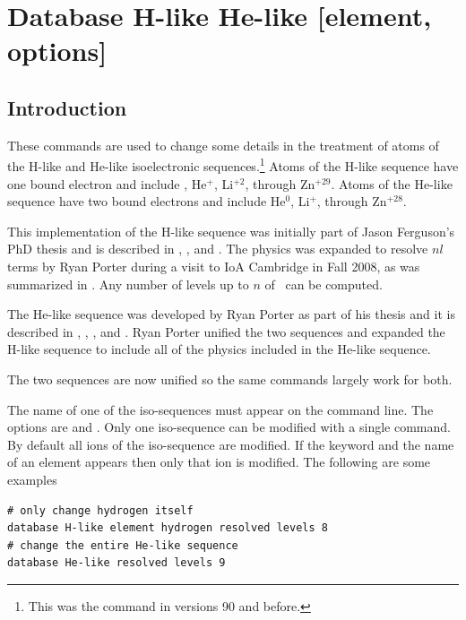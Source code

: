 \section{Database H-like \OR{} He-like [element, options]}
\label{sec:atom_H_He_like}

\subsection{Introduction}
These commands are used to change some details in the treatment of atoms of the
H-like and He-like isoelectronic sequences.\footnote{This was the 
command in versions 90 and before.}
Atoms of the H-like sequence
have one bound electron and include \hO, He$^{+}$, Li$^{+2}$,
through Zn$^{+29}$.
Atoms of the He-like sequence have two bound electrons and include He$^0$,
Li$^+$, through Zn$^{+28}$.

This implementation of the H-like sequence was initially part of Jason
Ferguson's PhD thesis and is described in \citet{FergusonFerland1997},
\citet{Ferguson2001}, and \citet{BottorffBaldwin2002}.
The physics was expanded
to resolve $nl$ terms by Ryan Porter during a visit to IoA
Cambridge in Fall 2008, as was summarized in 
\citet{LuridianaEtAl09}.
Any number of levels up to $n$ of \nHydroMaxLevel\ can be computed.

The He-like sequence was developed by Ryan Porter as part
of his thesis and it is described in \citet{Bauman2005},
\citet{Porter2005},  \citet{PorterFerland2007}, and
\citet{Porter.R12Improved-He-I-emissivities-in-the-case-B-approximation}.
Ryan Porter unified the two sequences
and expanded the H-like sequence to include all of the physics included
in the He-like sequence.

The two sequences are now unified so the same
 commands largely work
for both.

The name of one of the iso-sequences must appear on the command line.  
The options are  and .
Only one iso-sequence can be modified
with a single command.
By default all ions of the iso-sequence are modified.
If the keyword  and
the name of an element appears then
only that ion is modified.  
The following are some examples

\begin{verbatim}
# only change hydrogen itself
database H-like element hydrogen resolved levels 8
# change the entire He-like sequence
database He-like resolved levels 9
\end{verbatim}

